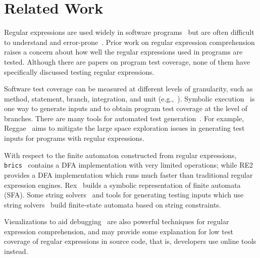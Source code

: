 \section{Related Work}
\label{sec:related}
Regular expressions are used widely in software programs~\cite{chapman2016} but are often difficult to understand and error-prone~\cite{chapman2017exploring}. Prior work on regular expression comprehension~\cite{chapman2017exploring} raises a concern about how well the regular expressions used in programs are tested. Although there are papers on program test coverage, none of them have specifically discussed testing regular expressions.

Software test coverage can be measured at different levels of granularity, such as method, statement, branch, integration, and unit (e.g.,~\cite{malaiya2002software, ammann2016introduction, zhu1997software,li2009experimental,piwowarski1993coverage}). Symbolic execution~\cite{klee,jpf,xie2005symstra,bucur2011parallel} is one way to generate inputs and to obtain program test coverage at the level of branches. There are many tools for automated test generation~\cite{zhang2011combined,fraser2013does,pacheco2007randoop}. For example, Reggae~\cite{li2009reggae} aims to mitigate the large space exploration issues in generating test inputs for programs with regular expressions. %

With respect to the finite automaton constructed from regular expressions, {\tt brics}~\cite{brics} contains a DFA implementation with very limited operations; while RE2~\cite{cox2007regular,re2} provides a DFA implementation which runs much faster than traditional regular expression engines. Rex~\cite{rex} builds a symbolic representation of finite automata (SFA). Some string solvers~\cite{kiezun2009hampi} and tools for generating testing inputs which use string solvers~\cite{wassermann2008dynamic,Ghosh:2013:JAT:2486788.2486925} build finite-state automata based on string constraints.

Visualizations to aid debugging~\cite{beck2014regviz,regex101} are also powerful techniques for regular expression comprehension, and may provide some explanation for low test coverage of regular expressions in source code, that is, developers use online tools instead. 

